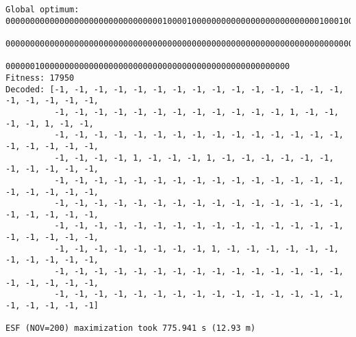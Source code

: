 \documentclass{article}
\begin{document}
    \begin{Verbatim}[commandchars=\\\{\}]
Global optimum: 00000000000000000000000000000000100001000000000000000000000000001000100
                00000000000000000000000000000000000000000000000000000000000000000000000
                0000001000000000000000000000000000000000000000000000000000
Fitness: 17950
Decoded: [-1, -1, -1, -1, -1, -1, -1, -1, -1, -1, -1, -1, -1, -1, -1, -1, -1, -1, -1, -1,
          -1, -1, -1, -1, -1, -1, -1, -1, -1, -1, -1, -1, 1, -1, -1, -1, -1, 1, -1, -1,
          -1, -1, -1, -1, -1, -1, -1, -1, -1, -1, -1, -1, -1, -1, -1, -1, -1, -1, -1, -1,
          -1, -1, -1, -1, 1, -1, -1, -1, 1, -1, -1, -1, -1, -1, -1, -1, -1, -1, -1, -1,
          -1, -1, -1, -1, -1, -1, -1, -1, -1, -1, -1, -1, -1, -1, -1, -1, -1, -1, -1, -1,
          -1, -1, -1, -1, -1, -1, -1, -1, -1, -1, -1, -1, -1, -1, -1, -1, -1, -1, -1, -1,
          -1, -1, -1, -1, -1, -1, -1, -1, -1, -1, -1, -1, -1, -1, -1, -1, -1, -1, -1, -1,
          -1, -1, -1, -1, -1, -1, -1, -1, 1, -1, -1, -1, -1, -1, -1, -1, -1, -1, -1, -1,
          -1, -1, -1, -1, -1, -1, -1, -1, -1, -1, -1, -1, -1, -1, -1, -1, -1, -1, -1, -1,
          -1, -1, -1, -1, -1, -1, -1, -1, -1, -1, -1, -1, -1, -1, -1, -1, -1, -1, -1, -1]

ESF (NOV=200) maximization took 775.941 s (12.93 m)
    \end{Verbatim}

    \begin{center}
    \end{center}
    { \hspace*{\fill} \\}





    
\end{document}
